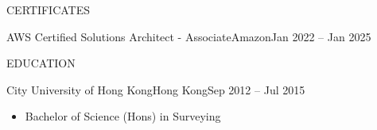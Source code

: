 \documentclass[]{resume}
\begin{document}
    \begin{cvsection}{CERTIFICATES}
        \begin{cvsubsection}{AWS Certified Solutions Architect - Associate}{Amazon}{Jan 2022 -- Jan 2025}
        \end{cvsubsection}
    \end{cvsection}

	\begin{cvsection}{EDUCATION}

		\begin{cvsubsection}{City University of Hong Kong}{Hong Kong}{Sep 2012 -- Jul 2015}
			\begin{itemize}
				\item Bachelor of Science (Hons) in Surveying
			\end{itemize}
		\end{cvsubsection}
	\end{cvsection}

\end{document}

